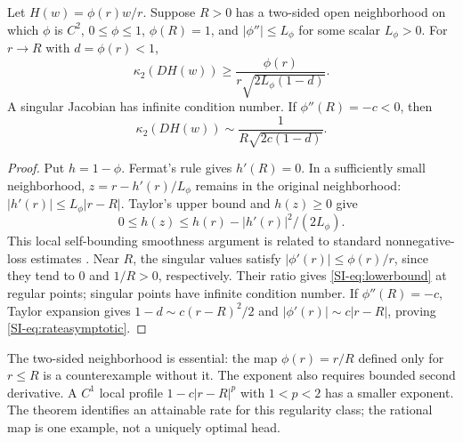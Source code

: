 \begin{theorem}
\label{SI-thm:rate}
Let $H(w)=\phi(r)w/r$. Suppose $R>0$ has a two-sided open neighborhood on which $\phi$ is $C^2$, $0\leq\phi\leq1$, $\phi(R)=1$, and $|\phi''|\leq L_\phi$ for some scalar $L_\phi>0$. For $r\to R$ with $d=\phi(r)<1$,
\begin{equation}
 \kappa_2(DH(w))\geq\frac{\phi(r)}{r\sqrt{2L_\phi(1-d)}}.
 \label{SI-eq:lowerbound}
\end{equation}
A singular Jacobian has infinite condition number. If $\phi''(R)=-c<0$, then
\begin{equation}
 \kappa_2(DH(w))\sim\frac{1}{R\sqrt{2c(1-d)}}.
 \label{SI-eq:rateasymptotic}
\end{equation}
\end{theorem}
\begin{proof}
Put $h=1-\phi$. Fermat's rule gives $h'(R)=0$. In a sufficiently small neighborhood, $z=r-h'(r)/L_\phi$ remains in the original neighborhood: $|h'(r)|\leq L_\phi|r-R|$. Taylor's upper bound and $h(z)\geq0$ give
\begin{equation*}
 0\leq h(z)\leq h(r)-|h'(r)|^2/(2L_\phi).
\end{equation*}
This local self-bounding smoothness argument is related to standard nonnegative-loss estimates \cite{supp-selfbound}. Near $R$, the singular values satisfy $|\phi'(r)|\le\phi(r)/r$, since they tend to $0$ and $1/R>0$, respectively. Their ratio gives \eqref{SI-eq:lowerbound} at regular points; singular points have infinite condition number. If $\phi''(R)=-c$, Taylor expansion gives $1-d\sim c(r-R)^2/2$ and $|\phi'(r)|\sim c|r-R|$, proving \eqref{SI-eq:rateasymptotic}.
\end{proof}
The two-sided neighborhood is essential: the map $\phi(r)=r/R$ defined only for $r\leq R$ is a counterexample without it. The exponent also requires bounded second derivative. A $C^1$ local profile $1-c|r-R|^p$ with $1<p<2$ has a smaller exponent. The theorem identifies an attainable rate for this regularity class; the rational map is one example, not a uniquely optimal head.

